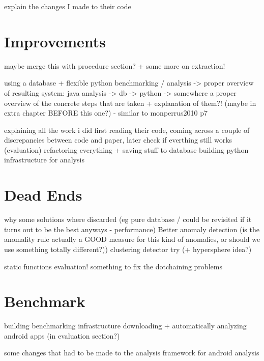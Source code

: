 explain the changes I made to their code

\section{Improvements}
maybe merge this with procedure section?
+ some more on extraction!

using a database + flexible python benchmarking / analysis
-> proper overview of resulting system: java analysis -> db -> python
-> somewhere a proper overview of the concrete steps that are taken + explanation of them?! (maybe in extra chapter BEFORE this one?) - similar to monperrus2010 p7

explaining all the work i did
    first reading their code, coming across a couple of discrepancies between code and paper, later check if everthing still works (evaluation)
    refactoring everything + saving stuff to database
    building python infrastructure for analysis

\section{Dead Ends}
why some solutions where discarded (eg pure database / could be revisited if it turns out to be the best anyways - performance)
Better anomaly detection (is the anomality rule actually a GOOD measure for this kind of anomalies, or should we use something totally different?))
    clustering detector try (+ hypersphere idea?)

static functions evaluation!
something to fix the dotchaining problems

\section{Benchmark}

building benchmarking infrastructure
downloading + automatically analyzing android apps (in evaluation section?)

some changes that had to be made to the analysis framework for android analysis
